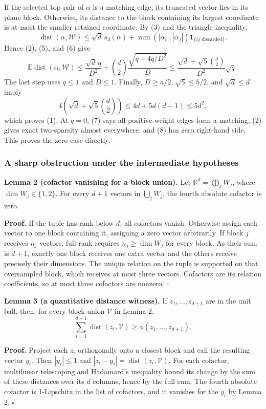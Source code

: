 \documentclass[
  11pt,
]{article}
\begin{document}
If the selected top pair of \(\alpha\) is a matching edge, its truncated
vector lies in its plane block. Otherwise, its distance to the block
containing its largest coordinate is at most the smaller retained
coordinate. By (3) and the triangle inequality, \[
 \operatorname{dist}(\alpha,\mathcal W)
 \le\sqrt d\,s_3(\alpha)
  +\min(|\alpha_i|,|\alpha_j|)
       \mathbf1_{\{ij\text{ discarded}\}}.
\] Hence (2), (5), and (6) give \[
 \mathbb E\operatorname{dist}(\alpha,\mathcal W)
 \le\frac{\sqrt d\,q}{D^2}
   +\binom d2\frac{\sqrt{q+4q/D^2}}D
 \le\frac{\sqrt d+\sqrt5\binom d2}{D^2}\sqrt q.             \tag{8}
\] The last step uses \(q\le1\) and \(D\le1\). Finally, \(D\ge a/2\),
\(\sqrt5\le5/2\), and \(\sqrt d\le d\) imply \[
 4\left(\sqrt d+\sqrt5\binom d2\right)
 \le4d+5d(d-1)\le5d^2,
\] which proves (1). At \(q=0\), (7) says all positive-weight edges form
a matching, (2) gives exact two-sparsity almost everywhere, and (8) has
zero right-hand side. This proves the zero case directly.

\subsubsection{A sharp obstruction under the intermediate
hypotheses}\label{a-sharp-obstruction-under-the-intermediate-hypotheses}

\textbf{Lemma 2 (cofactor vanishing for a block union).} Let
\(\mathbb R^d=\bigoplus_jW_j\), where \(\dim W_j\in\{1,2\}\). For every
\(d+1\) vectors in \(\bigcup_jW_j\), the fourth absolute cofactor is
zero.

\textbf{Proof.} If the tuple has rank below \(d\), all cofactors vanish.
Otherwise assign each vector to one block containing it, assigning a
zero vector arbitrarily. If block \(j\) receives \(n_j\) vectors, full
rank requires \(n_j\ge\dim W_j\) for every block. As their sum is
\(d+1\), exactly one block receives one extra vector and the others
receive precisely their dimensions. The unique relation on the tuple is
supported on that oversampled block, which receives at most three
vectors. Cofactors are its relation coefficients, so at most three
cofactors are nonzero. \(\square\)

\textbf{Lemma 3 (a quantitative distance witness).} If
\(z_1,\ldots,z_{d+1}\) are in the unit ball, then, for every block union
\(\mathcal V\) in Lemma 2, \[
 \sum_{i=1}^{d+1}\operatorname{dist}(z_i,\mathcal V)
 \ge\phi(z_1,\ldots,z_{d+1}).                               \tag{9}
\]

\textbf{Proof.} Project each \(z_i\) orthogonally onto a closest block
and call the resulting vector \(y_i\). Then \(|y_i|\le1\) and
\(|z_i-y_i|=\operatorname{dist}(z_i,\mathcal V)\). For each cofactor,
multilinear telescoping and Hadamard's inequality bound its change by
the sum of these distances over its \(d\) columns, hence by the full
sum. The fourth absolute cofactor is 1-Lipschitz in the list of
cofactors, and it vanishes for the \(y_i\) by Lemma 2. \(\square\)
\end{document}
